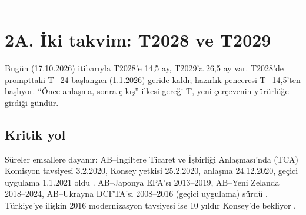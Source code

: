 \endgroup

\begin{center}\rule{0.5\linewidth}{0.5pt}\end{center}

\hypertarget{00_plan-2a-iux307ki-takvim-t2028-ve-t2029}{%
\section{2A. İki takvim: T2028 ve T2029}\label{00_plan-2a-iux307ki-takvim-t2028-ve-t2029}}

Bugün (17.10.2026) itibarıyla T2028'e 14,5 ay, T2029'a 26,5 ay var. T2028'de prompttaki T−24 başlangıcı (1.1.2026) geride kaldı; hazırlık penceresi T−14,5'ten başlıyor. ``Önce anlaşma, sonra çıkış'' ilkesi gereği T, yeni çerçevenin yürürlüğe girdiği gündür.

\hypertarget{00_plan-kritik-yol}{%
\subsection{Kritik yol}\label{00_plan-kritik-yol}}

Süreler emsallere dayanır: AB--İngiltere Ticaret ve İşbirliği Anlaşması'nda (TCA) Komisyon tavsiyesi 3.2.2020, Konsey yetkisi 25.2.2020, anlaşma 24.12.2020, geçici uygulama 1.1.2021 oldu \etiketV{}. AB--Japonya EPA'sı 2013--2019, AB--Yeni Zelanda 2018--2024, AB--Ukrayna DCFTA'sı 2008--2016 (geçici uygulama) sürdü \etiketV{}. Türkiye'ye ilişkin 2016 modernizasyon tavsiyesi ise 10 yıldır Konsey'de bekliyor \etiketV{}.

\begingroup\gbtablo\footnotesize

